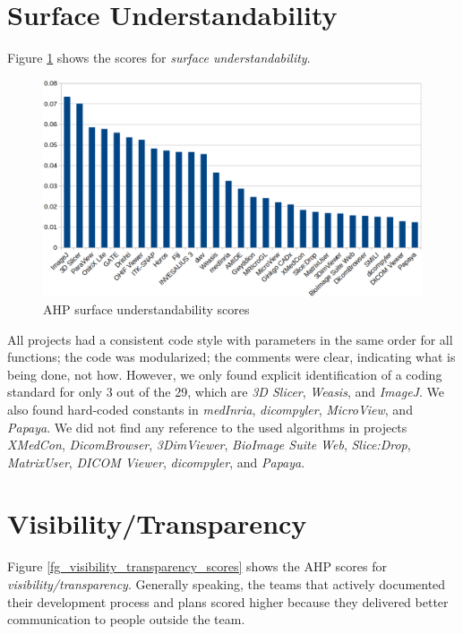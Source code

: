 \section{Surface Understandability}
Figure \ref{fg_surface_understandability_scores} shows the scores for \textit{surface understandability}.

\begin{figure}[H]
\includegraphics[scale=0.38]{figures/understandability_scores.png}
\caption{AHP surface understandability scores}
\label{fg_surface_understandability_scores}
\end{figure}

All projects had a consistent code style with parameters in the same order for all functions; the code was modularized; the comments were clear, indicating what is being done, not how. However, we only found explicit identification of a coding standard for only 3 out of the 29, which are \textit{3D Slicer}, \textit{Weasis}, and \textit{ImageJ}. We also found hard-coded constants in \textit{medInria}, \textit{dicompyler}, \textit{MicroView}, and \textit{Papaya}. We did not find any reference to the used algorithms in projects \textit{XMedCon}, \textit{DicomBrowser}, \textit{3DimViewer}, \textit{BioImage Suite Web}, \textit{Slice:Drop}, \textit{MatrixUser}, \textit{DICOM Viewer}, \textit{dicompyler}, and \textit{Papaya}. 

\section{Visibility/Transparency}
Figure \ref{fg_visibility_transparency_scores} shows the AHP scores for \textit{visibility/transparency}. Generally speaking, the teams that actively documented their development process and plans scored higher because they delivered better communication to people outside the team.

